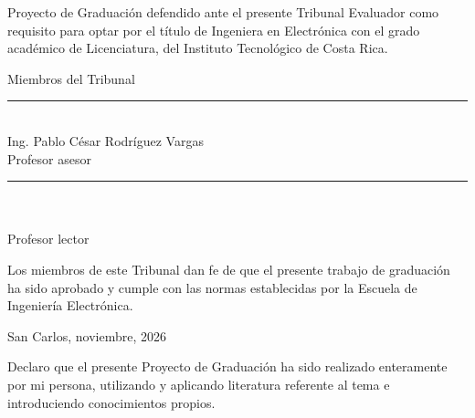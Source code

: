 \documentclass[12pt,a4paper,oneside]{report}
\begin{document}
\vspace{1.2cm}

\noindent Proyecto de Graduación defendido ante el presente Tribunal Evaluador como
requisito para optar por el título de Ingeniera en Electrónica con el grado académico
de Licenciatura, del Instituto Tecnológico de Costa Rica.

\vspace{0.6cm}

\begin{center}
    Miembros del Tribunal
\end{center}

\vspace{2.2cm}

\noindent
\begin{minipage}[t]{0.49\textwidth}
    \centering
    \rule{6cm}{0.4pt}\\[2pt]
    Ing. Pablo César Rodríguez Vargas\\[6pt]
    Profesor asesor
\end{minipage}
\hfill
\begin{minipage}[t]{0.49\textwidth}
    \centering
    \rule{6cm}{0.4pt}\\[2pt]
    \nombrelector\\[6pt]
    Profesor lector
\end{minipage}

\vspace{2.2cm}

\noindent Los miembros de este Tribunal dan fe de que el presente trabajo de graduación
ha sido aprobado y cumple con las normas establecidas por la Escuela de Ingeniería
Electrónica.

\vspace{1.2cm}

\begin{center}
    San Carlos, noviembre, 2026
\end{center}

\clearpage

\thispagestyle{empty}

\vspace*{5cm}

\noindent Declaro que el presente Proyecto de Graduación ha sido realizado enteramente por
mi persona, utilizando y aplicando literatura referente al tema e introduciendo
conocimientos propios.
\end{document}
